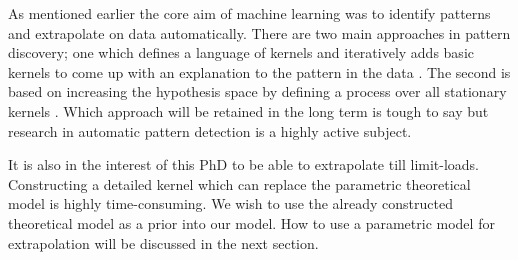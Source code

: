 As mentioned earlier the core aim of machine learning was to identify patterns and extrapolate on data automatically. There are two main approaches in pattern discovery; one which defines a language of kernels and iteratively adds basic kernels to come up with an explanation to the pattern in the data \cite{lloyd2014automatic}. The second is based on increasing the hypothesis space by defining a process over all stationary kernels \cite{wilson2012process}. Which approach will be retained in the long term is tough to say but research in automatic pattern detection is a highly active subject. 

It is also in the interest of this PhD to be able to extrapolate till limit-loads. Constructing a detailed kernel which can replace the parametric theoretical model is highly time-consuming. We wish to use the already constructed theoretical model as a prior into our model. How to use a parametric model for extrapolation will be discussed in the next section.


